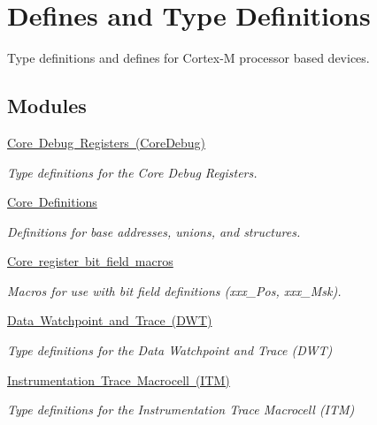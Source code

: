 \hypertarget{group__CMSIS__core__register}{}\section{Defines and Type Definitions}
\label{group__CMSIS__core__register}


Type definitions and defines for Cortex-\/M processor based devices.  


\subsection*{Modules}
\begin{DoxyCompactItemize}
\item 
\mbox{\hyperlink{group__CMSIS__CoreDebug}{Core Debug Registers (\+Core\+Debug)}}
\begin{DoxyCompactList}\small\item\em Type definitions for the Core Debug Registers. \end{DoxyCompactList}\item 
\mbox{\hyperlink{group__CMSIS__core__base}{Core Definitions}}
\begin{DoxyCompactList}\small\item\em Definitions for base addresses, unions, and structures. \end{DoxyCompactList}\item 
\mbox{\hyperlink{group__CMSIS__core__bitfield}{Core register bit field macros}}
\begin{DoxyCompactList}\small\item\em Macros for use with bit field definitions (xxx\+\_\+\+Pos, xxx\+\_\+\+Msk). \end{DoxyCompactList}\item 
\mbox{\hyperlink{group__CMSIS__DWT}{Data Watchpoint and Trace (\+D\+W\+T)}}
\begin{DoxyCompactList}\small\item\em Type definitions for the Data Watchpoint and Trace (D\+WT) \end{DoxyCompactList}\item 
\mbox{\hyperlink{group__CMSIS__ITM}{Instrumentation Trace Macrocell (\+I\+T\+M)}}
\begin{DoxyCompactList}\small\item\em Type definitions for the Instrumentation Trace Macrocell (I\+TM) \end{DoxyCompactList}\item 

\end{DoxyCompactItemize}
